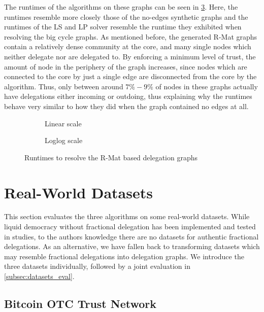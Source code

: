 The runtimes of the algorithms on these graphs can be seen in \cref{fig:rmat}. Here, the runtimes resemble more closely those of the no-edges synthetic graphs and the runtimes of the LS and LP solver resemble the runtime they exhibited when resolving the big cycle graphs. As mentioned before, the generated R-Mat graphs contain a relatively dense community at the core, and many single nodes which neither delegate nor are delegated to. By enforcing a minimum level of trust, the amount of node in the periphery of the graph increases, since nodes which are connected to the core by just a single edge are disconnected from the core by the algorithm. Thus, only between around $7\% - 9\%$ of nodes in these graphs actually have delegations either incoming or outdoing, thus explaining why the runtimes behave very similar to how they did when the graph contained no edges at all.

\begin{figure}[t]
    \centering
    \begin{subfigure}[t]{0.45\textwidth}
        \centering
        \caption{Linear scale}
        \label{subfig:rmat_linear}
    \end{subfigure}
    \hfill
    \begin{subfigure}[t]{0.45\textwidth}
        \centering
        \caption{Loglog scale}
        \label{subfig:rmat_loglog}
    \end{subfigure}
    \caption{Runtimes to resolve the R-Mat based delegation graphs}
    \label{fig:rmat}
\end{figure}


\section{Real-World Datasets}

This section evaluates the three algorithms on some real-world datasets. While liquid democracy without fractional delegation has been implemented and tested in studies, to the authors knowledge there are no datasets for authentic fractional delegations. As an alternative, we have fallen back to transforming datasets which may resemble fractional delegations into delegation graphs. We  introduce the three datasets individually, followed by a joint evaluation in \cref{subsec:datasets_eval}.

\subsection{Bitcoin OTC Trust Network}

